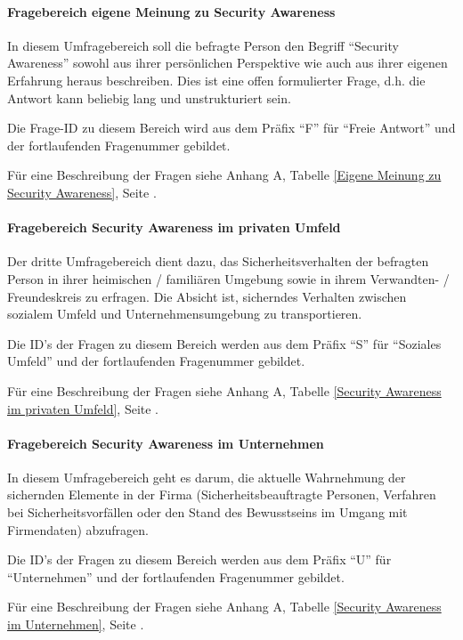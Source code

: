 \documentclass[../../main.tex]{subfiles}
\begin{document}
\paragraph*{Fragebereich eigene Meinung zu Security Awareness}\mbox{}

\begin{sloppypar}
In diesem Umfragebereich soll die befragte Person den Begriff "`Security Awareness"' sowohl aus ihrer persönlichen Perspektive wie auch aus ihrer eigenen Erfahrung heraus beschreiben. Dies ist eine offen formulierter Frage, d.h. die Antwort kann beliebig lang und unstrukturiert sein.

Die Frage-ID zu diesem Bereich wird aus dem Präfix "`F"' für "`Freie Antwort"' und der fortlaufenden Fragenummer gebildet.

Für eine Beschreibung der Fragen siehe Anhang A, Tabelle \ref{Eigene Meinung zu Security Awareness}, Seite \pageref{Eigene Meinung zu Security Awareness}.
\end{sloppypar}


\paragraph*{Fragebereich Security Awareness im privaten Umfeld}\mbox{}

\begin{sloppypar}
Der dritte Umfragebereich dient dazu, das Sicherheitsverhalten der befragten Person in ihrer heimischen / familiären Umgebung sowie in ihrem Verwandten- / Freundeskreis zu erfragen. Die Absicht ist, sicherndes Verhalten zwischen sozialem Umfeld und Unternehmensumgebung zu transportieren.

Die ID's der Fragen zu diesem Bereich werden aus dem Präfix "`S"' für "`Soziales Umfeld"' und der fortlaufenden Fragenummer gebildet.

Für eine Beschreibung der Fragen siehe Anhang A, Tabelle \ref{Security Awareness im privaten Umfeld}, Seite \pageref{Security Awareness im privaten Umfeld}.
\end{sloppypar}


\paragraph*{Fragebereich Security Awareness im Unternehmen}\mbox{}

\begin{sloppypar}
In diesem Umfragebereich geht es darum, die aktuelle Wahrnehmung der sichernden Elemente in der Firma (Sicherheitsbeauftragte Personen, Verfahren bei Sicherheitsvorfällen oder den Stand des Bewusstseins im Umgang mit Firmendaten) abzufragen.

Die ID's der Fragen zu diesem Bereich werden aus dem Präfix "`U"' für "`Unternehmen"' und der fortlaufenden Fragenummer gebildet.

Für eine Beschreibung der Fragen siehe Anhang A, Tabelle \ref{Security Awareness im Unternehmen}, Seite \pageref{Security Awareness im Unternehmen}.
\end{sloppypar}
\end{document}
